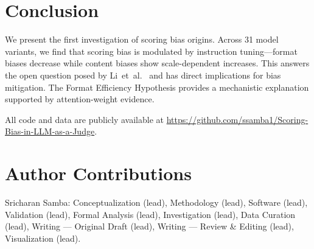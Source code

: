 \documentclass[11pt,a4paper]{article}
\begin{document}
\section{Conclusion}

We present the first investigation of scoring bias origins. Across 31 model variants, we find that scoring bias is modulated by instruction tuning---format biases decrease while content biases show scale-dependent increases. This answers the open question posed by Li~et~al.~\cite{li2025scoring} and has direct implications for bias mitigation. The Format Efficiency Hypothesis provides a mechanistic explanation supported by attention-weight evidence.

All code and data are publicly available at \url{https://github.com/ssamba1/Scoring-Bias-in-LLM-as-a-Judge}.

\section*{Author Contributions}
Sricharan Samba: Conceptualization (lead), Methodology (lead), Software (lead), Validation (lead), Formal Analysis (lead), Investigation (lead), Data Curation (lead), Writing --- Original Draft (lead), Writing --- Review \& Editing (lead), Visualization (lead).



\end{document}
